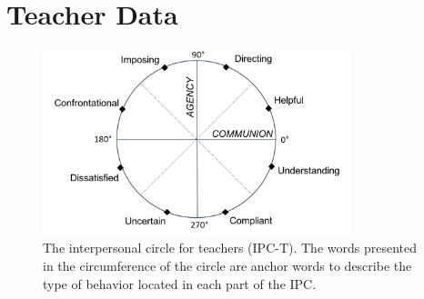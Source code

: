 \documentclass[man]{apa6}
\theoremstyle{definition}
\theoremstyle{definition}
\theoremstyle{definition}
\theoremstyle{remark}
\begin{document}
\section{Teacher Data}\label{Example}

\begin{figure}
\centering
\includegraphics[width = 0.8\textwidth]{Plots/IPC-T.png}
\caption{The interpersonal circle for teachers (IPC-T). The words presented in
the circumference of the circle are anchor words to describe the type of
behavior located in each part of the IPC.}
\label{QTI}
\end{figure}
\end{document}
